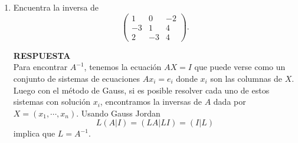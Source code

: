 \documentclass[11pt,letterpaper]{article}
\newcommand{\res}{\textbf{RESPUESTA}\\}
\newcommand{\grstep}[2][\relax]{%
   \ensuremath{\mathrel{
       {\mathop{\longrightarrow}\limits^{#2\mathstrut}_{
                                     \begin{subarray}{l} #1 \end{subarray}}}}}}
\begin{document}
\begin{enumerate}
\res
Transformemos 
\begin{equation*}
\left(\begin{array}{rrrrrr}
1  & -3 & 1 & -1 &  0 & 1\\
-1 &  3 & 0 &  3 &  1 & 3 \\
2  & -6 & 3 &  0 & -1 & 2\\
-1 &  3 & 1 &  5 &  1 & 6
\end{array}\right) \begin{pmatrix}
x_1\\
x_2\\
x_3\\
x_4\\
x_5\\
x_6
\end{pmatrix}=\begin{pmatrix}
0\\
0\\
0\\
0\\
0\\
0
\end{pmatrix}.
\end{equation*}
Entonces ocupando reducción
\begin{equation*}
\left(\begin{array}{rrrrrr}
1  & -3 & 1 & -1 &  0 & 1\\
-1 &  3 & 0 &  3 &  1 & 3 \\
2  & -6 & 3 &  0 & -1 & 2\\
-1 &  3 & 1 &  5 &  1 & 6
\end{array}\right) %
\grstep[R3 \rightarrow R_3 -2R_1]{R_2 \rightarrow R_2 -3R_1}
%
\end{equation*}
\item Encuentra la inversa de 
\begin{equation*}
\left(\begin{array}{rrr}
 1 &  0 & -2\\
-3 &  1 &  4\\
 2 & -3 &  4
\end{array}\right).
\end{equation*}

\res
Para encontrar $A^{-1}$, tenemos la ecuación $AX=I$ que puede verse como un conjunto de sistemas de ecuaciones $Ax_i=e_i$ donde $x_i$ son las columnas de $X$. Luego con el método de Gauss, si es posible resolver cada uno de estos sistemas con solución $x_i$, encontramos la inversas de $A$ dada por $X=(x_1, \cdots , x_n)$. Usando Gauss Jordan
$$L(A|I)=(LA|LI)=(I|L)$$
implica que $L=A^{-1}$. 


\end{enumerate}
\end{document}
